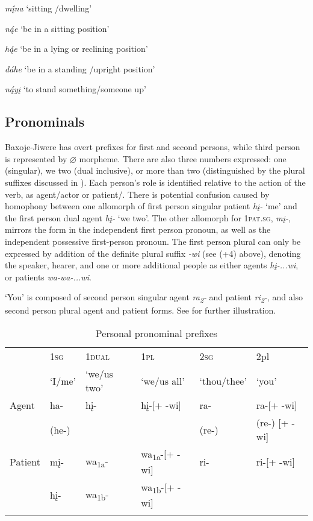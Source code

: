 \documentclass[output=paper]{LSP/langsci}
\begin{document}
\ex \textit{m\k{í}na}   {\upshape `sitting /dwelling'}

\ex \textit{n\k{á}e}  {\upshape `be in a sitting position'}

\ex \textit{h\k{á}e}   {\upshape `be in a lying or reclining position'}

\ex \textit{dáhe}   {\upshape `be in a standing /upright position'}

\ex \textit{n\k{á}y\k{i}}    {\upshape `to stand something/someone up'}
\z
\z

\subsection{Pronominals}
Baxoje-Jiwere has overt prefixes for first and second persons, while third person is represented by $\varnothing$ morpheme.  There are also three numbers expressed:  one (singular), we two (dual inclusive), or more than two (distinguished by the plural suffixes discussed in ).  Each person's role is identified relative to the action of the verb, as agent/actor or patient/. There is potential confusion caused by homophony between one allomorph of first person singular patient \textit{h\k{i}-} `me' and the first person dual agent \textit{h\k{i}-} `we two'.  The other allomorph for 1\textsc{pat.sg}, \textit{m\k{i}-}, mirrors the form in the independent first person pronoun, as well as the independent possessive first-person pronoun.  The first person plural can only be expressed by addition of the definite plural suffix \textit{-wi} (see (+4) above), denoting the speaker, hearer, and one or more additional people as either agents \textit{h\k{i}-...wi}, or patients \textit{wa-wa-...wi}.  

`You' is composed of second person singular agent \textit{ra\textsubscript{2}-} and patient \textit{ri\textsubscript{2}-}, and also second person plural agent and patient forms.  See  for further illustration. 

\begin{table}
\begin{tabular}{ l l l l l l }
\lsptoprule
& 1\textsc{sg} &  1\textsc{dual} & 1\textsc{pl}  & 2\textsc{sg} &  2{pl}  \\
& `I/me' & `we/us two' & `we/us all' & `thou/thee' & `you' \\
\midrule
Agent & ha-  	& h\k{i}- & h\k{i}-[+ -wi] & ra-  & ra-[+ -wi] \\
& (he-) & & &(re-) & (re-) [+ -wi] \\

Patient & m\k{i}- & wa\textsubscript{1a}-	& wa\textsubscript{1a}-[+ -wi]	&  ri- & ri-[+ -wi] \\
& h\k{i}-	& wa\textsubscript{1b}- & wa\textsubscript{1b}-[+ -wi]	& & \\
\lspbottomrule \end{tabular}

\caption{Personal pronominal prefixes} \label{personalpronominals}
\end{table}
\end{document}

